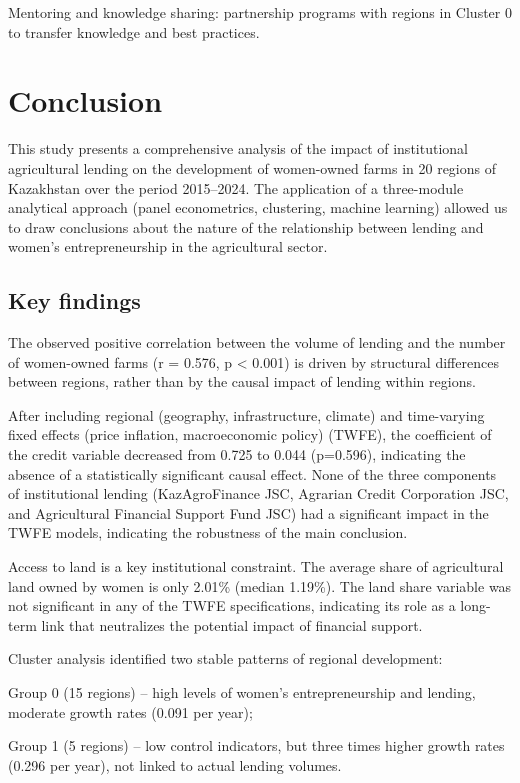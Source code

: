 ﻿\documentclass[pdflatex,sn-mathphys-ay]{sn-jnl}
\begin{document}
Mentoring and knowledge sharing: partnership programs with regions in
Cluster 0 to transfer knowledge and best practices.

\section{Conclusion}

This study presents a comprehensive analysis of the impact of
institutional agricultural lending on the development of women-owned
farms in 20 regions of Kazakhstan over the period 2015--2024. The
application of a three-module analytical approach (panel econometrics,
clustering, machine learning) allowed us to draw conclusions about the
nature of the relationship between lending and women's entrepreneurship
in the agricultural sector.

\subsection{Key findings}

The observed positive correlation between the volume of lending and the
number of women-owned farms (r = 0.576, p \textless{} 0.001) is driven
by structural differences between regions, rather than by the causal
impact of lending within regions.

After including regional (geography, infrastructure, climate) and
time-varying fixed effects (price inflation, macroeconomic policy)
(TWFE), the coefficient of the credit variable decreased from 0.725 to
0.044 (p=0.596), indicating the absence of a statistically significant
causal effect. None of the three components of institutional lending
(KazAgroFinance JSC, Agrarian Credit Corporation JSC, and Agricultural
Financial Support Fund JSC) had a significant impact in the TWFE models,
indicating the robustness of the main conclusion.

Access to land is a key institutional constraint. The average share of
agricultural land owned by women is only 2.01\% (median 1.19\%). The
land share variable was not significant in any of the TWFE
specifications, indicating its role as a long-term link that neutralizes
the potential impact of financial support.

Cluster analysis identified two stable patterns of regional development:

Group 0 (15 regions) -- high levels of women's entrepreneurship and
lending, moderate growth rates (0.091 per year);

Group 1 (5 regions) -- low control indicators, but three times higher
growth rates (0.296 per year), not linked to actual lending volumes.
\end{document}
